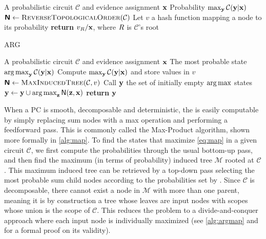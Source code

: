 \begin{algorithm}[t]
  \caption{\map}\label{alg:map}
  \begin{algorithmic}[1]
    \Require A probabilistic circuit $\mathcal{C}$ and evidence assignment $\mathbf{x}$
    \Ensure Probability $\max_{\mathbf{y}}\mathcal{C}(\mathbf{y}|\mathbf{x})$
    \State $\Nodes\gets\textproc{ReverseTopologicalOrder}(\mathcal{C})$
    \State Let $v$ a hash function mapping a node to its probability
    \EndFor%
    \State \textbf{return} $v_{\normalfont{R}}/\mathcal{\mathbf{x}}$, where $\normalfont{R}$ is
    $\mathcal{C}$'s root
  \end{algorithmic}
\end{algorithm}

\begin{algorithm}[t]
  \caption{\textsf{ARG}\map}\label{alg:argmap}
  \begin{algorithmic}[1]
    \Require A probabilistic circuit $\mathcal{C}$ and evidence assignment $\mathbf{x}$
    \Ensure The most probable state $\operatorname*{\normalfont{arg\,max}}_{\mathbf{y}}\mathcal{C}(\mathbf{y}|\mathbf{x})$
    \State Compute $\max_{\mathbf{y}}\mathcal{C}(\mathbf{y}|\mathbf{x})$ and store values in $v$
    \State $\Nodes\gets\textproc{MaxInducedTree}(\mathcal{C}, v)$
    \State Call $\mathbf{y}$ the set of initially empty $\operatorname*{\normalfont{arg\,max}}$ states
      \State $\mathbf{y}\gets\mathbf{y}\cup\operatorname*{\normalfont{arg\,max}}_{\mathbf{z}}\operatorname{\textsf{N}}(\mathbf{z},\mathbf{x})$
    \EndFor%
    \State \textbf{return} $\mathbf{y}$
  \end{algorithmic}
\end{algorithm}

When a PC is smooth, decomposable and deterministic, the \map{} is easily computable by simply
replacing sum nodes with a max operation and performing a feedforward \evi{} pass. This is commonly
called the Max-Product algorithm, shown more formally in \cref{alg:map}. To find the states that
maximize \cref{eq:map} in a given circuit $\mathcal{C}$, we first compute the \map{} probabilities
through the usual bottom-up pass, and then find the maximum (in terms of probability) induced tree
$\mathcal{M}$ rooted at $\mathcal{C}$. This maximum induced tree can be retrieved by a top-down
pass selecting the most probable sum child nodes according to the probabilities set by \map{}.
Since $\mathcal{C}$ is decomposable, there cannot exist a node in $\mathcal{M}$ with more than one
parent, meaning it is by construction a tree whose leaves are input nodes with scopes whose union
is the scope of $\mathcal{C}$. This reduces the problem to a divide-and-conquer approach where each
input node is individually maximized (see \cref{alg:argmap} and  for a formal
proof on its validity).

